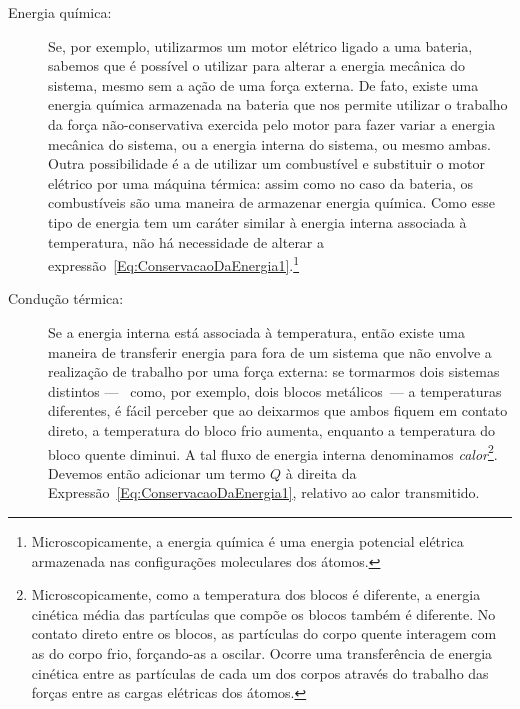 \begin{description}
    \item[Energia química:] Se, por exemplo, utilizarmos um motor elétrico ligado a uma bateria, sabemos que é possível o utilizar para alterar a energia mecânica do sistema, mesmo sem a ação de uma força externa. De fato, existe uma energia química armazenada na bateria que nos permite utilizar o trabalho da força não-conservativa exercida pelo motor para fazer variar a energia mecânica do sistema, ou a energia interna do sistema, ou mesmo ambas. Outra possibilidade é a de utilizar um combustível e substituir o motor elétrico por uma máquina térmica: assim como no caso da bateria, os combustíveis são uma maneira de armazenar energia química. Como esse tipo de energia tem um caráter similar à energia interna associada à temperatura, não há necessidade de alterar a expressão~\eqref{Eq:ConservacaoDaEnergia1}.\footnote{Microscopicamente, a energia química é uma energia potencial elétrica armazenada nas configurações moleculares dos átomos.}
    
    \item[Condução térmica:] Se a energia interna está associada à temperatura, então existe uma maneira de transferir energia para fora de um sistema que não envolve a realização de trabalho por uma força externa: se tormarmos dois sistemas distintos ---~ como, por exemplo, dois blocos metálicos~--- a temperaturas diferentes, é fácil perceber que ao deixarmos que ambos fiquem em contato direto, a temperatura do bloco frio aumenta, enquanto a temperatura do bloco quente diminui. A tal fluxo de energia interna denominamos \emph{calor}\footnote[][-3cm]{Microscopicamente, como a temperatura dos blocos é diferente, a energia cinética média das partículas que compõe os blocos também é diferente. No contato direto entre os blocos, as partículas do corpo quente interagem com as do corpo frio, forçando-as a oscilar. Ocorre uma transferência de energia cinética entre as partículas de cada um dos corpos através do trabalho das forças entre as cargas elétricas dos átomos.}. Devemos então adicionar um termo $Q$ à direita da Expressão~\eqref{Eq:ConservacaoDaEnergia1}, relativo ao calor transmitido.


\end{description}
